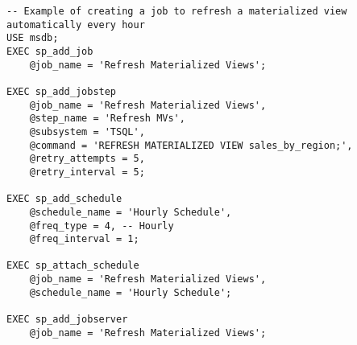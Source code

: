 
         \begin{lstlisting}
-- Example of creating a job to refresh a materialized view automatically every hour
USE msdb;
EXEC sp_add_job 
    @job_name = 'Refresh Materialized Views';

EXEC sp_add_jobstep 
    @job_name = 'Refresh Materialized Views',
    @step_name = 'Refresh MVs',
    @subsystem = 'TSQL',
    @command = 'REFRESH MATERIALIZED VIEW sales_by_region;',
    @retry_attempts = 5,
    @retry_interval = 5;

EXEC sp_add_schedule 
    @schedule_name = 'Hourly Schedule', 
    @freq_type = 4, -- Hourly 
    @freq_interval = 1;

EXEC sp_attach_schedule 
    @job_name = 'Refresh Materialized Views', 
    @schedule_name = 'Hourly Schedule';

EXEC sp_add_jobserver 
    @job_name = 'Refresh Materialized Views';
        \end{lstlisting}